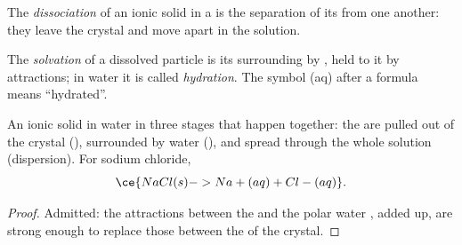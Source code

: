 \begin{definition}[Dissociation]\label{def:g11:dissolution:dissociation}
The \emph{dissociation} of an ionic solid in a
 is the separation of its  from one another: they leave the
crystal and move apart in the solution.
\end{definition}

\begin{definition}\label{def:g11:dissolution:solvation}
The \emph{solvation} of a dissolved particle is its
surrounding by  , held to it by attractions; in water it
is called \emph{hydration}. The symbol (aq) after a
formula means ``hydrated''.
\end{definition}

\begin{proposition}\label{prop:g11:dissolution:stages}
An ionic solid  in water in three stages that happen together:
the  are pulled out of the crystal (), surrounded by
water  (), and spread through the whole solution
(dispersion). For sodium chloride,
\[
  \ce{NaCl(s) -> Na+(aq) + Cl-(aq)} .
\]
\end{proposition}

\begin{proof}
Admitted: the attractions between the  and the polar water
, added up, are strong enough to replace those between the
 of the crystal.
\end{proof}


